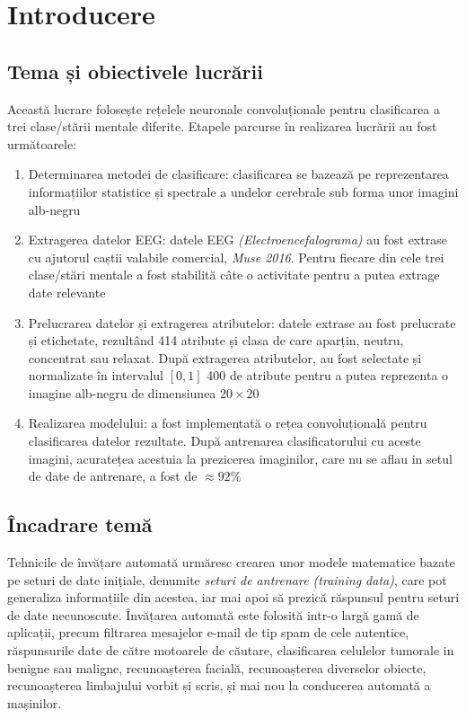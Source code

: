 \chapter{Introducere}\label{ch:1intro}

\section{Tema și obiectivele lucrării}
Această lucrare folosește rețelele neuronale convoluționale pentru clasificarea a trei clase/stării mentale diferite. Etapele parcurse în realizarea lucrării au fost următoarele:
\begin{enumerate}
\item Determinarea metodei de clasificare: clasificarea se bazează pe reprezentarea informațiilor statistice și spectrale a undelor cerebrale sub forma unor imagini alb-negru
\item Extragerea datelor EEG: datele EEG \textit{(Electroencefalograma)} au fost extrase cu ajutorul caștii valabile comercial, \textit{Muse 2016}. Pentru fiecare din cele trei clase/stări mentale a fost stabilită câte o activitate pentru a putea extrage date relevante
\item Prelucrarea datelor și extragerea atributelor: datele extrase au fost prelucrate și etichetate, rezultând 414 atribute și clasa de care aparțin, neutru, concentrat sau relaxat. După extragerea atributelor, au fost selectate și normalizate în intervalul $[0,1]$ 400 de atribute pentru a putea reprezenta o imagine alb-negru de dimensiunea $20\times20$
\item Realizarea modelului: a fost implementată o rețea convoluțională pentru clasificarea datelor rezultate. După antrenarea clasificatorului cu aceste imagini, acuratețea acestuia la prezicerea imaginilor, care nu se aflau in setul de date de antrenare, a fost de $\approx92\%$
\end{enumerate}

\section{Încadrare temă}
Tehnicile de învățare automată urmăresc crearea unor modele matematice bazate pe seturi de date inițiale, denumite \textit{seturi de antrenare (training data)}, care pot generaliza informațiile din acestea, iar mai apoi să prezică răspunsul pentru seturi de date necunoscute. Învățarea automată este folosită intr-o largă gamă de aplicații, precum filtrarea mesajelor e-mail de tip spam de cele autentice, răspunsurile date de către motoarele de căutare, clasificarea celulelor tumorale in benigne sau maligne, recunoașterea facială, recunoașterea diverselor obiecte, recunoașterea limbajului vorbit și scris, și mai nou la conducerea automată a mașinilor. 

